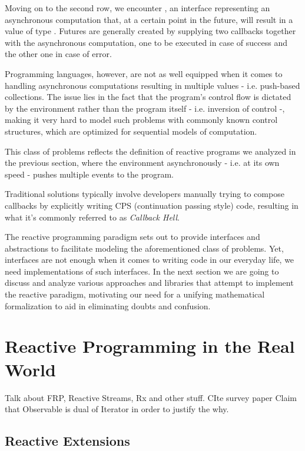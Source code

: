 Moving on to the second row, we encounter , an interface representing an asynchronous computation that, at a certain point in the future, will result in a value of type . Futures are generally created by supplying two callbacks together with the asynchronous computation, one to be executed in case of success and the other one in case of error. 

Programming languages, however, are not as well equipped when it comes to handling asynchronous computations resulting in multiple values - i.e. push-based collections. The issue lies in the fact that the program's control flow is dictated by the environment rather than the program itself - i.e. inversion of control -, making it very hard to model such problems with commonly known control structures, which are optimized for sequential models of computation.

This class of problems reflects the definition of reactive programs we analyzed in the previous section, where the environment asynchronously - i.e. at its own speed - pushes multiple events to the program. 

Traditional solutions typically involve developers manually trying to compose callbacks by explicitly writing CPS (continuation passing style) code\cite{meijer2015spicing}, resulting in what it's commonly referred to as \textit{Callback Hell}\cite{edwards2009coherent}.

The reactive programming paradigm sets out to provide interfaces and abstractions to facilitate modeling the aforementioned class of problems. Yet, interfaces are not enough when it comes to writing code in our everyday life, we need implementations of such interfaces. In the next section we are going to discuss and analyze various approaches and libraries that attempt to implement the reactive paradigm, motivating our need for a unifying mathematical formalization to aid in eliminating doubts and confusion. 

\section{Reactive Programming in the Real World}

Talk about FRP, Reactive Streams, Rx and other stuff. CIte survey paper
Claim that Observable is dual of Iterator in order to justify the why.

\subsection{Reactive Extensions}
\label{subsec:rx}

